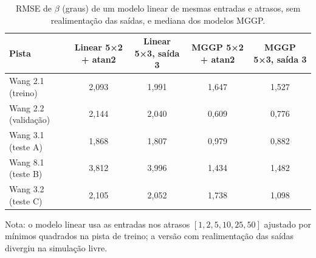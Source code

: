 \begin{table}[htbp]
    \centering
    \caption{RMSE de $\beta$ (graus) de um modelo linear de mesmas entradas e atrasos, sem realimentação das saídas, e mediana dos modelos MGGP.}
    \label{tab:linear}
    \footnotesize
    \begin{tabular}{lcccc}
        \toprule
        \textbf{Pista} & \textbf{Linear 5×2 + atan2} & \textbf{Linear 5×3, saída 3} & \textbf{MGGP 5×2 + atan2} & \textbf{MGGP 5×3, saída 3} \\
        \midrule
        Wang 2.1 (treino) & 2,093 & 1,991 & 1,647 & 1,527 \\
        Wang 2.2 (validação) & 2,144 & 2,040 & 0,609 & 0,776 \\
        Wang 3.1 (teste A) & 1,868 & 1,807 & 0,979 & 0,882 \\
        Wang 8.1 (teste B) & 3,812 & 3,996 & 1,434 & 1,482 \\
        Wang 3.2 (teste C) & 2,105 & 2,052 & 1,738 & 1,098 \\
        \bottomrule
    \end{tabular}
    \par\footnotesize Nota: o modelo linear usa as entradas nos atrasos $[1, 2, 5, 10, 25, 50]$ ajustado por mínimos quadrados na pista de treino; a versão com realimentação das saídas divergiu na simulação livre.
\end{table}
